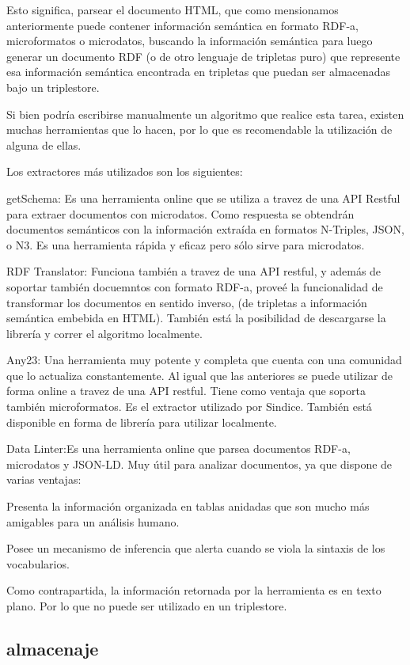 Esto significa, parsear el documento HTML, que como mensionamos anteriormente puede contener información semántica en formato RDF-a, microformatos o microdatos, buscando 
la información semántica para luego generar un documento RDF (o de otro lenguaje de tripletas puro) que represente esa información semántica encontrada en tripletas que puedan ser almacenadas bajo un triplestore.

Si bien podría escribirse manualmente un algoritmo que realice esta tarea, existen muchas herramientas que lo hacen, por lo que es recomendable la utilización de alguna de ellas.

Los extractores más utilizados son los siguientes:

getSchema: Es una herramienta online que se utiliza a travez de una API Restful para extraer documentos con microdatos. Como respuesta se obtendrán documentos semánticos 
con la información extraída en formatos N-Triples, JSON, o N3. 
Es una herramienta rápida y eficaz pero sólo sirve para microdatos.

RDF Translator: Funciona también a travez de una API restful, y además de soportar también docuemntos con formato RDF-a, proveé la funcionalidad de transformar los documentos en sentido inverso, 
(de tripletas a información semántica embebida en HTML). 
También está la posibilidad de descargarse la librería y correr el algoritmo localmente.

Any23: Una herramienta muy potente y completa que cuenta con una comunidad que lo actualiza constantemente. Al igual que las anteriores se puede utilizar de forma online a travez 
de una API restful. Tiene como ventaja que soporta también microformatos. Es el extractor utilizado por Sindice. 
También está disponible en forma de librería para utilizar localmente.

Data Linter:Es una herramienta online que parsea documentos RDF-a, microdatos y JSON-LD.  
Muy útil para analizar documentos, ya que dispone de varias ventajas: 

Presenta la información organizada en tablas anidadas que son mucho más amigables para un análisis humano. 

Posee un mecanismo de inferencia que alerta cuando se viola la sintaxis de los vocabularios.

Como contrapartida, la información retornada por la herramienta es en texto plano. Por lo que no puede ser utilizado en un triplestore.


\subsection{almacenaje}

